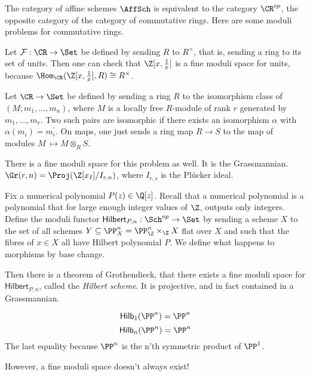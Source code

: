 \documentclass[11pt, english]{article}
\begin{document}
The category of affine schemes $\AffSch$ is equivalent to the category $\CR^{op}$, the opposite category of the category of commutative rings. Here are some moduli problems for commutative rings.

\begin{example}
Let $\mathcal F:\CR \to \Set$ be defined by sending $R$ to $R^\times$, that is, sending a ring to its set of units. Then one can check that $\Z[x,\frac 1x]$ is a fine moduli space for units, because $\Hom_\CR(\Z[x,\frac 1x],R) \cong R^\times$.
\end{example}

\begin{example}
Let $\CR \to \Set$ be defined by sending a ring $R$ to the isomorphism class of $(M;m_1,\dotsc,m_n)$, where $M$ is a locally free $R$-module of rank $r$ generated by $m_1,\dotsc,m_r$. Two such pairs are isomorphic if there exists an isomorphism $\alpha$ with $\alpha(m_i)=m_i^\prime$. On maps, one just sends a ring map $R \to S$ to the map of modules $M \ \mapsto M \otimes_R S$.

There is a fine moduli space for this problem as well. It is the Grassmannian. $\Gr(r,n)= \Proj(\Z[x_I]/I_{r,n})$, where $I_{r,s}$ is the Plücker ideal. 
\end{example}

\begin{example}
Fix a numerical polynomial $P(z) \in \Q[z]$. Recall that a numerical polynomial is a polynomial that for large enough integer values of $\Z$, outputs only integers. Define the moduli functor $\mathsf{Hilbert}_{P,n}:\Sch^{op} \to \Set$ by sending a scheme $X$ to the set of all schemes $Y \subseteq \PP_X^n = \PP_\Z^n \times_\Z X$ flat over $X$ and such that the fibres of $x \in X$ all have Hilbert polynomial $P$. We define what happens to morphisms by base change.

Then there is a theorem of Grothendieck, that there exists a fine moduli space for $\mathsf{Hilbert}_{P,n}$, called the \emph{Hilbert scheme}. It is projective, and in fact contained in a Grassmannian.
\end{example}

\begin{example}
\[
\mathsf{Hilb}_1(\PP^n) = \PP ^n
\]
\[
\mathsf{Hilb}_n(\PP ^n) = \PP ^n
\]
The last equality because $\PP^n$ is the n'th symmetric product of $\PP ^1$.
\end{example}

However, a fine moduli space doesn't always exist! 
\end{document}
